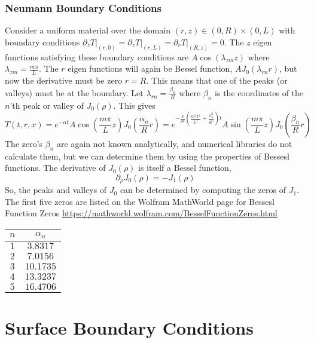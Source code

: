 \documentclass[letterpaper,12pt]{article}
\begin{document}
\subsubsection{Neumann Boundary Conditions}
Consider a uniform material over the domain $(r,z) \in (0,R)\times(0,L)$ with boundary conditions
$\left.\partial_z T\right|_{(r,0)} = \left.\partial_z T\right|_{(r,L)} = \left.\partial_r T\right|_{(R,z)} = 0$.
The $z$ eigen functions satisfying these boundary conditions are
$A \cos(\lambda_{zm} z)$ where $\lambda_{zm} = \frac{m\pi}{L}$.
The $r$ eigen functions will again be Bessel function, $A J_0(\lambda_{rn} r)$, but now the derivative must
be zero $r = R$. This means that one of the peaks (or valleys) must be at the boundary. Let $\lambda_{rn} = \frac{\beta_n}{R}$ where
$\beta_n$ is the coordinates of the $n$'th peak or valley of $J_0(\rho)$. This gives
\begin{equation}
T(t,r,x) = e^{-\alpha t} A \cos\left(\frac{m\pi}{L} z\right) J_0\left(\frac{\alpha_n}{R} r\right) = 
e^{-\frac{k}{\rho c}\left( \frac{m^2\pi^2}{L^2} + \frac{\beta_n^2}{R^2}\right) t} A \sin\left(\frac{m\pi}{L} z\right) J_0\left(\frac{\beta_n}{R} r\right)
\end{equation}
The zero's $\beta_n$ are again not known analytically, and numerical libraries do not calculate them, but we can determine them by using
the properties of Bessesl functions. The derivative of $J_0(\rho)$ is itself a Bessel function,
\begin{equation}
  \partial_\rho J_0(\rho) = -J_1(\rho)
\end{equation}
So, the peaks and valleys of $J_0$ can be determined by computing the zeros of $J_1$.
The first five zeros are listed on the Wolfram MathWorld page for Bessesl Function Zeros \url{https://mathworld.wolfram.com/BesselFunctionZeros.html}

\begin{tabular}{cc}
  $n$ & $\alpha_n$ \\
  \hline
  $1$ & $3.8317$ \\
  $2$ & $7.0156$ \\
  $3$ & $10.1735$ \\
  $4$ & $13.3237$ \\
  $5$ & $16.4706$
\end{tabular}


\section{Surface Boundary Conditions}
\end{document}
